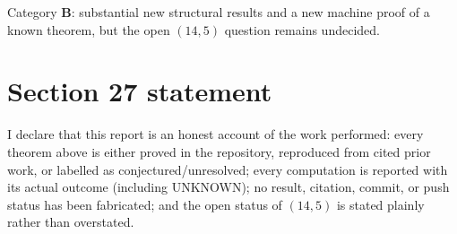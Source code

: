 \documentclass[11pt,a4paper]{article}
\theoremstyle{definition}
\theoremstyle{remark}
\begin{document}
Category \textbf{B}: substantial new structural results and a new machine proof
of a known theorem, but the open $(14,5)$ question remains undecided.

\section{Section 27 statement}

I declare that this report is an honest account of the work performed: every
theorem above is either proved in the repository, reproduced from cited prior
work, or labelled as conjectured/unresolved; every computation is reported with
its actual outcome (including UNKNOWN); no result, citation, commit, or push
status has been fabricated; and the open status of $(14,5)$ is stated plainly
rather than overstated.
\end{document}
